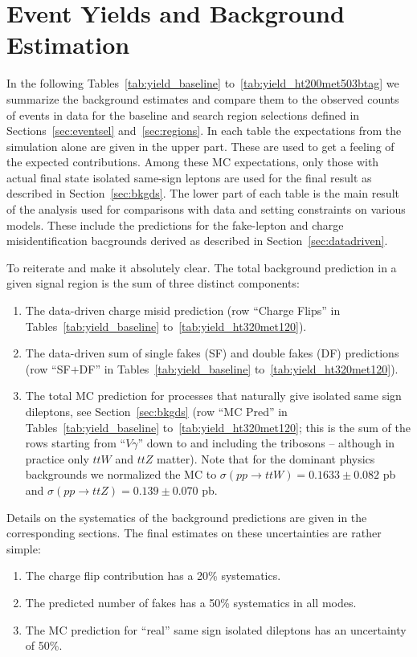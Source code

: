 \section{Event Yields and Background Estimation}
\label{sec:yields}

In the following Tables~\ref{tab:yield_baseline} 
to~\ref{tab:yield_ht200met503btag}
we summarize the background 
estimates and compare them to the
observed counts of events in data for the baseline and search region selections
defined in Sections~\ref{sec:eventsel} and~\ref{sec:regions}.
In each table the expectations from the simulation alone are given 
in the upper part.
 These are used to get a feeling of the expected contributions.
Among these MC expectations, 
only those with actual final state 
isolated same-sign leptons are used for the final result
as described in Section~\ref{sec:bkgds}.
The lower part of each table is the main result of the analysis
used for comparisons with data and setting constraints on various models.
These include the predictions for the fake-lepton and charge misidentification
bacgrounds derived as described in Section~\ref{sec:datadriven}.

To reiterate and make it absolutely clear.  The total background
prediction in a given signal region
is the sum of three distinct components:
\begin{enumerate}

\item The data-driven charge misid prediction (row ``Charge Flips'' in
Tables~\ref{tab:yield_baseline} to~\ref{tab:yield_ht320met120}).

\item The data-driven sum of single fakes (SF) and double fakes
(DF) predictions (row ``SF$+$DF''
in Tables~\ref{tab:yield_baseline} to~\ref{tab:yield_ht320met120}).

\item The total MC prediction for processes that naturally give isolated
same sign dileptons, see Section~\ref{sec:bkgds} (row ``MC Pred'' in
Tables~\ref{tab:yield_baseline} to~\ref{tab:yield_ht320met120};
this is the sum of the rows starting from ``$V\gamma$'' down to 
and including the tribosons -- although in practice only $ttW$ and 
$ttZ$ matter).  Note that for the dominant physics 
backgrounds we normalized the MC to $\sigma(pp \to ttW) = 0.1633 \pm 0.082$
pb and $\sigma(pp \to ttZ) = 0.139 \pm 0.070$ pb.

\end{enumerate}

Details on the systematics of the background predictions are given in the corresponding sections.
The final estimates on these uncertainties are rather simple:
\begin{enumerate}
\item The charge flip contribution has a 20\% systematics.
  \item The predicted number of fakes has a 50\% systematics in all modes.
  \item The MC prediction for ``real'' same sign isolated dileptons
    has an uncertainty of 50\%.
  
\end{enumerate}

